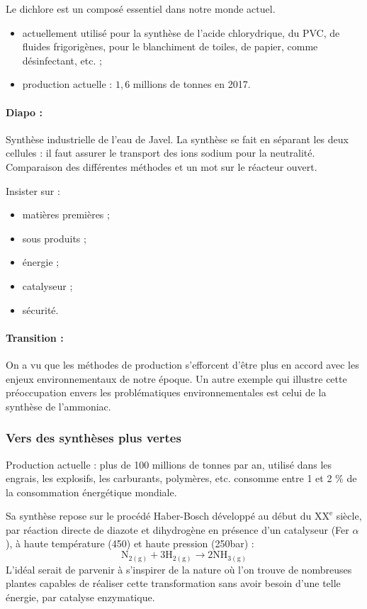 Le dichlore est un composé essentiel dans notre monde actuel.
\begin{itemize}
\item actuellement utilisé pour la synthèse de l'acide chlorydrique, du PVC, de fluides frigorigènes, pour le blanchiment de toiles, de papier, comme désinfectant, etc. ;
\item production actuelle : $1,6$ millions de tonnes en 2017.
\end{itemize}

\paragraph{Diapo :} Synthèse industrielle de l'eau de Javel.
La synthèse se fait en séparant les deux cellules : il faut assurer le transport des ions sodium pour la neutralité.
Comparaison des différentes méthodes et un mot sur le réacteur ouvert.

Insister sur :
\begin{itemize}
\item matières premières ;
\item sous produits ;
\item énergie ;
\item catalyseur ;
\item sécurité.
\end{itemize}

\paragraph{Transition : } On a vu que les méthodes de production s'efforcent d'être plus en accord avec les enjeux environnementaux de notre époque.
Un autre exemple qui illustre cette préoccupation envers les problématiques environnementales est celui de la synthèse de l'ammoniac.

\subsubsection{Vers des synthèses plus vertes}

Production actuelle : plus de 100 millions de tonnes par an, utilisé dans les engrais, les explosifs, les carburants, polymères, etc. consomme entre 1 et 2 \% de la consommation énergétique mondiale.

Sa synthèse repose sur le procédé Haber-Bosch développé au début du $\mathrm{XX^e}$ siècle, par réaction directe de diazote et dihydrogène en présence d'un catalyseur (Fer $\alpha$), à haute température (\unit{450}{\celsius}) et haute pression (\unit{250}{bar}) :
\begin{equation*}
\mathrm{N_{2(g)}} + 3\mathrm{H_{2(g)}} \rightarrow 2\mathrm{NH_{3(g)}}
\end{equation*}
L'idéal serait de parvenir à s'inspirer de la nature où l'on trouve de nombreuses plantes capables de réaliser cette transformation sans avoir besoin d'une telle énergie, par catalyse enzymatique.

